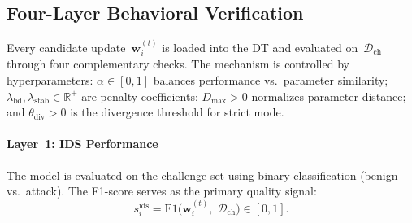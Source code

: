 
\subsection{Four-Layer Behavioral Verification}\label{sec:fourlayer}

Every candidate update~$\mathbf{w}_i^{(t)}$ is loaded into the DT and evaluated on~$\mathcal{D}_{\text{ch}}$ through four complementary checks. The mechanism is controlled by hyperparameters: $\alpha \in [0,1]$ balances performance vs.\ parameter similarity; $\lambda_{\text{bd}}, \lambda_{\text{stab}} \in \mathbb{R}^+$ are penalty coefficients; $D_{\max} > 0$ normalizes parameter distance; and $\theta_{\text{div}} > 0$ is the divergence threshold for strict mode.

\paragraph{Layer~1: IDS Performance} The model is evaluated on the challenge set using binary classification (benign vs.\ attack). The F1-score serves as the primary quality signal:
\begin{equation}
    s_i^{\text{ids}} = \text{F1}\bigl(\mathbf{w}_i^{(t)},\; \mathcal{D}_{\text{ch}}\bigr) \in [0,1].
\label{eq:ids}
\end{equation}

